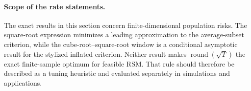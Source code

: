 \paragraph{Scope of the rate statements.}
The exact results in this section concern finite-dimensional population
risks. The square-root expression minimizes a leading approximation to the
average-subset criterion, while the cube-root--square-root window is a
conditional asymptotic result for the stylized inflated criterion. Neither
result makes $\operatorname{round}(\sqrt T)$ the exact finite-sample optimum
for feasible RSM. That rule should therefore be described as a tuning
heuristic and evaluated separately in simulations and applications.
